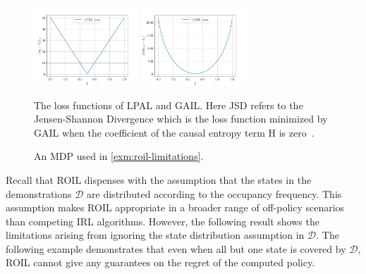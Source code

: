 \documentclass[10pt]{article}
\renewcommand{\cite}{\citep}
\theoremstyle{plain}
\theoremstyle{remark}
\begin{document}
\begin{figure}
\centering
\includegraphics[width=0.35\textwidth]{../src/plots/all_state/lpal_loss.pdf}
\hspace{0.05\linewidth}
\includegraphics[width=0.35\textwidth]{../src/plots/all_state/gail_loss.pdf}
\caption{The loss functions of LPAL and GAIL. Here JSD refers to the Jensen-Shannon Divergence which is the loss function minimized by GAIL when the coefficient of the 
causal entropy term H is zero~\cite{Ho2016}.}
\label{fig:loss_of_LPAL_GAIL}
\end{figure}

\begin{figure}
  \centering
{}
  \caption{An MDP used in \cref{exm:roil-limitations}.}
  \label{fig:roil-fail}
\end{figure}

Recall that ROIL dispenses with the assumption that the states in the demonstrations $\mathcal{D}$ are distributed according to the occupancy frequency. This assumption makes ROIL appropriate in a broader range of off-policy scenarios than competing IRL algorithms. However, the following result shows the limitations arising from ignoring the state distribution assumption in $\mathcal{D}$. The following example demonstrates that even when all but one state is covered by $\mathcal{D}$, ROIL cannot give any guarantees on the regret of the computed policy. 
\end{document}
